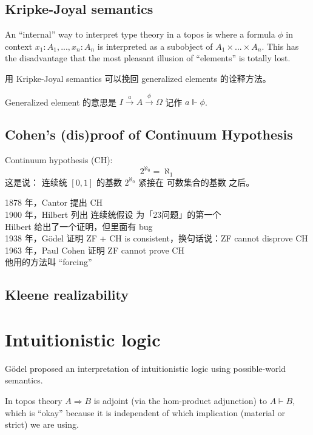 \subsection{Kripke-Joyal semantics}

An ``internal'' way to interpret type theory in a topos is where a formula $\phi$ in context $x_1: A_1, ... , x_n: A_n$ is interpreted as a subobject of $A_1 \times ... \times A_n$.  This has the disadvantage that the most pleasant illusion of ``elements'' is totally lost.

用 Kripke-Joyal semantics 可以挽回 generalized elements 的诠释方法。 

Generalized element 的意思是 $I \stackrel{a}{\rightarrow} A \stackrel{\phi}{\rightarrow} \Omega$ 记作 $a \Vdash \phi$.

\subsection{Cohen's (dis)proof of Continuum Hypothesis}

Continuum hypothesis (CH):
\begin{equation}
2^{\aleph_0} = \aleph_1
\end{equation}
这是说： 连续统 $[0,1]$ 的基数 $2^{\aleph_0}$ 紧接在 可数集合的基数 之后。

1878 年，Cantor 提出 CH \\
1900 年，Hilbert 列出 连续统假设 为「23问题」的第一个 \\
\tab Hilbert 给出了一个证明，但里面有 bug \\
1938 年，G\"{o}del 证明 ZF + CH is consistent，换句话说：ZF cannot disprove CH \\
1963 年，Paul Cohen 证明 ZF cannot prove CH \\
\tab 他用的方法叫 ``forcing''

\subsection{Kleene realizability}


\section{Intuitionistic logic}

G\"{o}del proposed an interpretation of intuitionistic logic using possible-world semantics.

In topos theory $A \Rightarrow B$ is adjoint (via the hom-product adjunction) to $A \vdash B$, which is ``okay'' because it is independent of which implication (material or strict) we are using.

